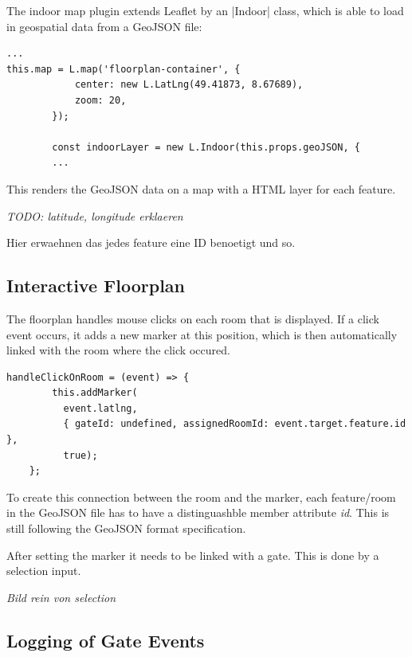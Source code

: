 The indoor map plugin extends Leaflet by an |Indoor| class, which is able to load in geospatial data from a GeoJSON file:

\begin{lstlisting}[label=setupMap]
...
this.map = L.map('floorplan-container', {
            center: new L.LatLng(49.41873, 8.67689),
            zoom: 20,
        });

        const indoorLayer = new L.Indoor(this.props.geoJSON, {
        ...
\end{lstlisting}

This renders the GeoJSON data on a map with a HTML layer for each feature.

\emph{TODO: latitude, longitude erklaeren}



Hier erwaehnen das jedes feature eine ID benoetigt und so.

\subsection{Interactive Floorplan}
\label{Interactive Floorplan}

The floorplan handles mouse clicks on each room that is displayed. If a click event occurs, it adds a new marker at this position, which is then automatically linked with the room where the click occured.

\begin{lstlisting}[label=addMarkers]
handleClickOnRoom = (event) => {
        this.addMarker(
          event.latlng, 
          { gateId: undefined, assignedRoomId: event.target.feature.id }, 
          true);
    };
\end{lstlisting}

To create this connection between the room and the marker, each feature/room in the GeoJSON file has to have a distinguashble member attribute \emph{id}. This is still following the GeoJSON format specification.

After setting the marker it needs to be linked with a gate. This is done by a selection input.

\emph{Bild rein von selection}



\subsection{Logging of Gate Events}
\label{Logging of Gate Events}

